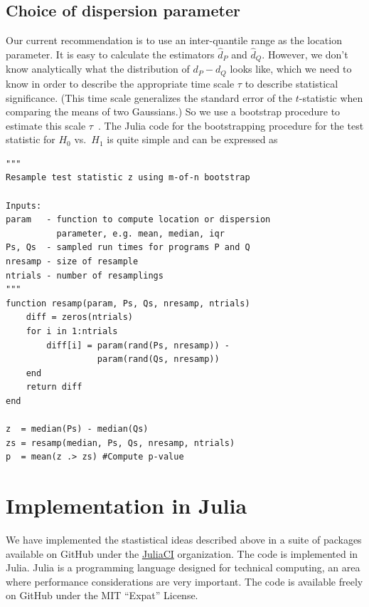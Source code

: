 \documentclass[conference]{IEEEtran}
\begin{document}


\subsection{Choice of dispersion parameter}

Our current recommendation is to use an inter-quantile range as the location parameter. It is easy to calculate the estimators $\hat d_P$ and $\hat d_Q$. However, we don't know analytically what the distribution of $d_P - d_Q$ looks like, which we need to know in order to describe the appropriate time scale $\tau$ to describe statistical significance. (This time scale generalizes the standard error of the $t$-statistic when comparing the means of two Gaussians.) So we use a bootstrap procedure to estimate this scale $\tau$~\cite{Chernick2008}. The Julia code for the bootstrapping procedure for the test statistic for $H_0$ vs.\ $H_1$ is quite simple and can be expressed as

\begin{lstlisting}
"""
Resample test statistic z using m-of-n bootstrap

Inputs:
param   - function to compute location or dispersion
          parameter, e.g. mean, median, iqr
Ps, Qs  - sampled run times for programs P and Q
nresamp - size of resample
ntrials - number of resamplings
"""
function resamp(param, Ps, Qs, nresamp, ntrials)
    diff = zeros(ntrials)
    for i in 1:ntrials
        diff[i] = param(rand(Ps, nresamp)) -
                  param(rand(Qs, nresamp))
    end
    return diff
end

z  = median(Ps) - median(Qs)
zs = resamp(median, Ps, Qs, nresamp, ntrials)
p  = mean(z .> zs) #Compute p-value
\end{lstlisting}




\section{Implementation in Julia}

We have implemented the stastistical ideas described above in a suite of packages available on GitHub under the \href{https://github.com/JuliaCI}{JuliaCI} organization.
The code is implemented in Julia. Julia is a programming language designed for technical computing, an area where performance considerations are very important.
The code is available freely on GitHub under the MIT ``Expat'' License.
\end{document}
